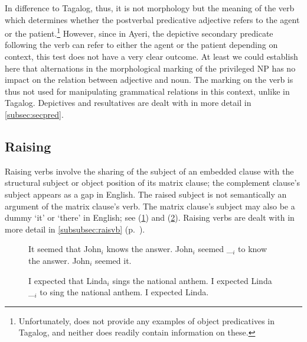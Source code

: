 In difference to Tagalog, thus, it is not morphology but the meaning of the
verb which determines whether the postverbal predicative adjective refers to
the agent or the patient.\footnote{Unfortunately, \citet{kroeger1991} does not
provide any examples of object predicatives in Tagalog, and neither does
\citet{schachterotanes1972} readily contain information on these.} However,
since in Ayeri, the depictive secondary predicate following the verb can refer
to either the agent or the patient depending on context, this test does not
have a very clear outcome. At least we could establish here that alternations
in the morphological marking of the privileged NP has no impact on the relation
between adjective and noun. The marking on the verb is thus not used for
manipulating grammatical relations in this context, unlike in Tagalog.
Depictives and resultatives are dealt with in more detail in
\autoref{subsec:secpred}.

\subsection{Raising}
\label{subsec:raising}

Raising verbs involve the sharing of the subject of an embedded clause with the
structural subject or object position of its matrix clause; the complement
clause's subject appears as a gap in English. The raised subject is not
semantically an argument of the matrix clause's verb. The matrix clause's
subject may also be a dummy `it' or `there' in English; see (\ref{ex:engrais})
and (\ref{ex:engrais2}). Raising verbs are dealt with in more detail in 
\autoref{subsubsec:raisvb} (p.~\pageref{subsubsec:raisvb}).

\begin{figure}[h]
\pex\label{ex:engrais}
	\a It seemed that John$_i$ knows the answer.
	\a John$_i$ seemed \_$_i$ to know the answer.
	\a \ljudge* John$_i$ seemed it.
\xe
\end{figure}

\begin{figure}[h]
\pex\label{ex:engrais2}
	\a I expected that Linda$_i$ sings the national anthem.
	\a I expected Linda \_$_i$ to sing the national anthem.
	\a \ljudge\excl I expected Linda.
\xe
\end{figure}

